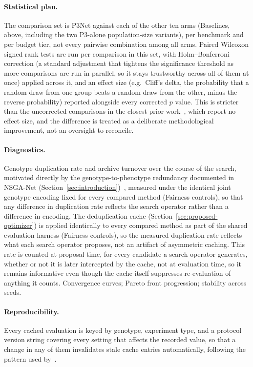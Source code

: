 \paragraph{Statistical plan.} The comparison set is P3Net against each of the other ten arms (Baselines,
above, including the two P3-alone population-size variants), per benchmark and per budget tier, not every
pairwise combination among all arms. Paired Wilcoxon
signed rank tests are run per comparison in this set, with Holm--Bonferroni correction (a standard
adjustment that tightens the significance threshold as more comparisons are run in parallel, so it stays
trustworthy across all of them at once) applied across it, and an effect size (e.g.\ Cliff's delta, the
probability that a random draw from one group beats a random draw from the other, minus the reverse
probability) reported alongside every corrected $p$ value. This is stricter than the uncorrected comparisons in the closest prior
work~\citep{bartnik2026evolutionary}, which report no effect size, and the difference is treated as a
deliberate methodological improvement, not an oversight to reconcile.

\paragraph{Diagnostics.} Genotype duplication rate and archive turnover over the course of the search,
motivated directly by the genotype-to-phenotype redundancy documented in NSGA-Net (Section~\ref{sec:introduction})~\citep{lu2019nsganet},
measured under the identical joint genotype encoding fixed for every compared method (Fairness controls),
so that any difference in duplication rate reflects the search operator rather than a difference in
encoding. The deduplication cache (Section~\ref{sec:proposed-optimizer}) is applied identically to every compared method as
part of the shared evaluation harness (Fairness controls), so the measured duplication rate reflects what
each search operator proposes, not an artifact of asymmetric caching. This rate is counted at proposal
time, for every candidate a search operator generates, whether or not it is later intercepted by the cache,
not at evaluation time, so it remains informative even though the cache itself suppresses re-evaluation of
anything it counts. Convergence curves; Pareto front
progression; stability across seeds.

\paragraph{Reproducibility.} Every cached evaluation is keyed by genotype, experiment type, and a protocol
version string covering every setting that affects the recorded value, so that a change in any of them
invalidates stale cache entries automatically, following the pattern used
by~\citep{bartnik2026evolutionary}.


